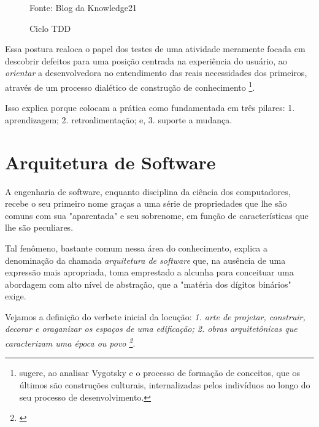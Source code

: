 \documentclass[12pt,a4paper,oneside,english,brazil]{article}
\begin{document}
      \begin{figure}[h!]
        \centering
        \caption{Ciclo TDD}
        Fonte: Blog da Knowledge21\footnotemark
        \label{fig:ciclotdd}
      \end{figure}

      Essa postura realoca o papel dos testes de uma atividade meramente focada
      em descobrir defeitos para uma posição centrada na experiência do
      usuário, ao  \emph{orientar} a desenvolvedora no entendimento das reais
      necessidades dos primeiros, através de um processo dialético de construção
      de conhecimento \footnote{ sugere, ao
      analisar Vygotsky e o processo de formação de conceitos, que os últimos
      são construções culturais, internalizadas pelos indivíduos ao longo do seu
      processo de desenvolvimento.}.

      Isso explica porque  colocam a prática
      como fundamentada em três pilares: 1. aprendizagem; 2. retroalimentação;
      e, 3. suporte a mudança.


  \section{Arquitetura de Software}

    A engenharia de software, enquanto disciplina da ciência dos
    computadores, recebe o seu primeiro nome graças a uma série de
    propriedades que lhe são comuns com sua "aparentada" e seu
    sobrenome, em função de características que lhe são peculiares.

    Tal fenômeno, bastante comum nessa área do conhecimento, explica a
    denominação da chamada \emph{arquitetura de software} que, na ausência de
    uma expressão mais apropriada, toma emprestado a alcunha para conceituar uma
    abordagem com alto nível de abstração, que a "matéria dos dígitos binários"
    exige.

    Vejamos a definição do verbete inicial da locução: \emph{1. arte de
    projetar, construir, decorar e oraganizar os espaços de uma edificação; 2.
    obras arquitetônicas que caracterizam uma época ou povo \footnote{\cite[p.
    81]{Kury2007}}}.
\end{document}

